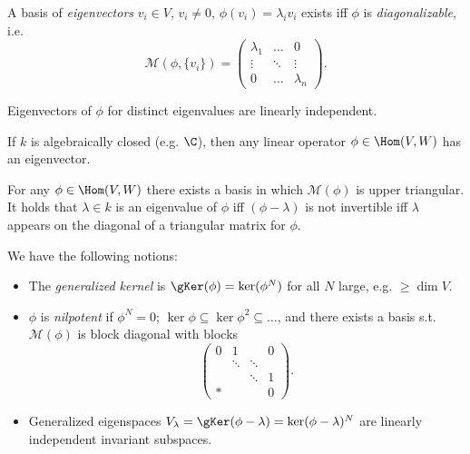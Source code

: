 \documentclass{notes}
\begin{document}
\begin{corollary}
    A basis of \emph{eigenvectors} $v_i\in V$, $v_i \neq 0$, $\phi (v_i)=\lambda _iv_i$ exists iff $\phi $ is \emph{diagonalizable}, i.e.
    \[
        \mathcal{M} (\phi ,\{v_i\})=\begin{pmatrix} \lambda _1 & \ldots & 0 \\ \vdots & \ddots & \vdots \\ 0 & \ldots & \lambda _n \end{pmatrix} 
    .\] 
\end{corollary}

\begin{corollary}
    Eigenvectors of $\phi $ for distinct eigenvalues are linearly independent.
\end{corollary}

\begin{theorem}
    If $k$ is algebraically closed (e.g. $\C $), then any linear operator $\phi \in \Hom (V,W)$ has an eigenvector.  
\end{theorem}

\begin{corollary}
    For any $\phi \in \Hom (V,W)$ there exists a basis in which $\mathcal{M} (\phi )$ is upper triangular. It holds that $\lambda \in k$ is an eigenvalue of $\phi $ iff $(\phi -\lambda )$ is not invertible iff $\lambda $ appears on the diagonal of a triangular matrix for $\phi $.
\end{corollary}

\begin{defn}
    We have the following notions:

    \begin{itemize}
        \item The \emph{generalized kernel} is $\gKer (\phi )=\ker (\phi ^N)$ for all $N$ large, e.g. $\ge \dim V$.
        \item $\phi $ is \emph{nilpotent} if $\phi ^N=0$; $\ker \phi \subseteq \ker \phi^2 \subseteq \ldots   $, and there exists a basis s.t. $\mathcal{M} (\phi )$ is block diagonal with blocks
        \[
            \begin{pmatrix} 0 & 1 & & 0 \\ & \ddots & \ddots & \\ &  & \ddots & 1 \\ * & & & 0 \end{pmatrix} 
        .\] 
    \item Generalized eigenspaces $V_{\lambda }=\gKer (\phi -\lambda )=\ker (\phi -\lambda )^N$ are linearly independent invariant subspaces.
    \end{itemize}
\end{defn}
\end{document}
